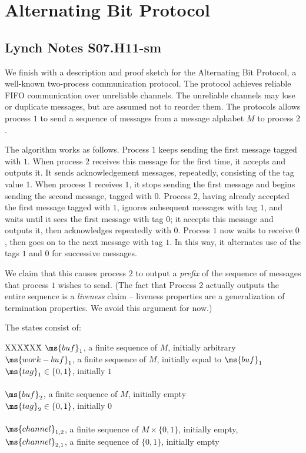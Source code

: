 \newcommand{\prcef}[1]{\textbf{Precondition}{: #1}}
\newcommand{\iocode}[2]{\textbf{IOCode}{#1 #2}}

\chapter{Alternating Bit Protocol}

\section{Lynch Notes S07.H11-sm}

We finish with a description and proof sketch for the Alternating Bit
Protocol, a well-known two-process communication protocol.
The protocol achieves reliable FIFO communication over unreliable
channels.  The unreliable channels may lose or duplicate messages, but
are assumed not to reorder them.
The protocols allows process $1$ to send a sequence of messages from a
message alphabet $M$ to process $2$.

The algorithm works as follows.
Process $1$ keeps sending the first message tagged with $1$. 
When process $2$ receives this message for the first time, it accepts
and outputs it.
It sends acknowledgement messages, repeatedly, consisting of the tag
value $1$.
When process $1$ receives $1$, it stops sending the first message and
begins sending the second message, tagged with $0$. 
Process $2$, having already accepted the first message tagged with
$1$, ignores subsequent messages with tag $1$, and waits until it
sees the first message with tag $0$;
it accepts this message and outputs it, then acknowledges repeatedly
with $0$. 
Process $1$ now waits to receive $0$, then goes on to the next message
with tag $1$.
In this way, it alternates use of the tags $1$ and $0$ for successive
messages.

We claim that this causes process $2$ to output a {\em prefix\/}
of the sequence of messages that process $1$ wishes to send.
(The fact that Process 2 actually outputs the entire sequence is a
{\em liveness\/} claim -- liveness properties are a generalization of
termination properties.  We avoid this argument for now.)

The states consist of:
\begin{tabbing}
XXX\=XXX\= \kill
\> $\ms{buf}_1$, a finite sequence of $M$, initially arbitrary \\
\> $\ms{work-buf}_1$, a finite sequence of $M$, initially equal to
$\ms{buf}_1$ \\
\> $\ms{tag}_1 \in \{ 0, 1 \}$, initially $1$ \\
\\
\> $\ms{buf}_2$, a finite sequence of $M$, initially empty \\
\> $\ms{tag}_2  \in \{ 0, 1 \}$, initially $0$ \\
\\
\> $\ms{channel}_{1,2}$, a finite sequence of $M \times \{ 0, 1 \}$,
initially empty, \\
\> $\ms{channel}_{2,1}$, a finite sequence of $\{ 0, 1 \}$, initially
empty 
\end{tabbing}

